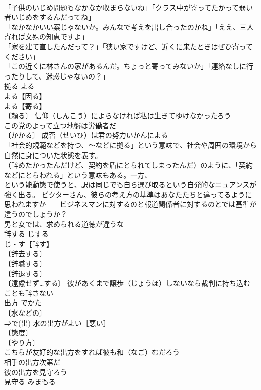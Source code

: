 \documentclass[8pt]{extreport}
\begin{document}
\begin{CJK}{UTF8}{min}
\\	「子供のいじめ問題もなかなか収まらないね」「クラス中が寄ってたかって弱い者いじめをするんだってね」 
\\	「なかなかいい案じゃないか。みんなで考えを出し合ったのかね」「ええ、三人寄れば文殊の知恵ですよ」 
\\	「家を建て直したんだって？」「狭い家ですけど、近くに来たときはぜひ寄ってください」 
\\	「この近くに林さんの家があるんだ。ちょっと寄ってみないか」「連絡なしに行ったりして、迷惑じゃないの？」 
\\	拠る	よる	
\\	よる【因る】 
\\	よる【寄る】 
\\	〔頼る〕 信仰（しんこう）によらなければ私は生きてゆけなかったろう 
\\	この党のよって立つ地盤は労働者だ 
\\	〔かかる〕 成否（せいひ）は君の努力いかんによる 
\\	「社会的規範などを持つ、～などに拠る」という意味で、社会や周囲の環境から自然に身についた状態を表す。
\\	（辞めたかったんだけど、契約を盾にとられてしまったんだ）のように、「契約などにとらわれる」という意味もある。一方、
\\	という能動態で使うと、訳は同じでも自ら選び取るという自発的なニュアンスが強く出る。 ビクターさん、彼らの考え方の基準はあなたたちと違ってるように思われますか――ビジネスマンに対するのと報道関係者に対するのとでは基準が違うのでしょうか？ 
\\	男と女では、求められる道徳が違うな 
\\	辞する	じする	
\\	じ・す【辞す】 
\\	〔辞去する〕
\\	〔辞職する〕
\\	〔辞退する〕
\\	〔遠慮せず…する〕 彼があくまで譲歩（じょうほ）しないなら裁判に持ち込むことも辞さない 
\\	出方	でかた	
\\	〔水などの〕
\\	⇒で(出) 水の出方がよい［悪い］ 
\\	〔態度〕
\\	〔やり方〕
\\	こちらが友好的な出方をすれば彼も和（なご）むだろう 
\\	相手の出方次第だ 
\\	彼の出方を見守ろう 
\\	見守る	みまもる	

\end{CJK}
\end{document}
